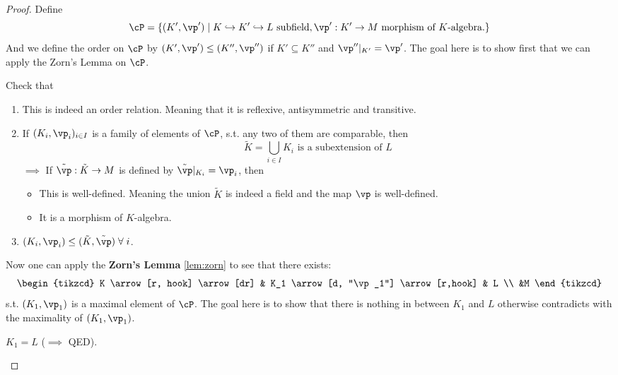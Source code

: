 \begin{proof}
	Define
	\[
		\cP = \{(K',\vp') \; |\; K \hookrightarrow K' \hookrightarrow L \text{ subfield}, \vp': K' \to M
		\text{ morphism of } K \text{-algebra.}\}
	\]
	And we define the order on \( \cP \) by \( (K',\vp')\leq (K'',\vp'') \) if \( K'\subseteq K'' \)
	and \( \vp''|_{K'} = \vp' \). The goal here is to show first that we can apply the Zorn's Lemma on
	\( \cP \).

	\begin{exercise}
		Check that
		\begin{enumerate}
			\item This is indeed an order relation. Meaning that it is reflexive, antisymmetric and
			      transitive.
			\item If \( (K_i,\vp_i)_{i\in I} \) is a family of elements of \( \cP \), s.t. any two of them
			      are comparable, then
			      \[
				      \tilde{K} = \bigcup_{i\in I} K_i \text{ is a subextension of } L
			      \]
			      \( \implies \) If \( \tilde\vp: \tilde{K} \to M \) is defined by \( \tilde{\vp}|_{K_i} = \vp_i \),
			      then
			      \begin{itemize}
				      \item This is well-defined. Meaning the union \( \tilde{K} \) is indeed a field and the
				            map \( \vp \) is well-defined.
				      \item It is a morphism of \( K \)-algebra.
			      \end{itemize}
			\item \( (K_i,\vp_i) \leq (\tilde{K},\tilde\vp) \; \forall \; i \).
		\end{enumerate}
	\end{exercise}
	Now one can apply the \textbf{Zorn's Lemma} \ref{lem:zorn}
	to see that there exists:
	\[
		\begin{tikzcd}
			K \arrow[r,  hook] \arrow[dr] & K_1 \arrow[d, "\vp_1"] \arrow[r,hook] & L \\
			&M
		\end{tikzcd}
	\]
	s.t. \( (K_1,\vp_1) \) is a maximal element of \( \cP \). The goal here is to show that there is
	nothing in between \( K_1 \) and \( L \) otherwise contradicts with the maximality of \(
	(K_1,\vp_1) \).
	\begin{claim}
		\( K_1 = L \) (\( \implies \) QED).
	\end{claim}


\end{proof}

